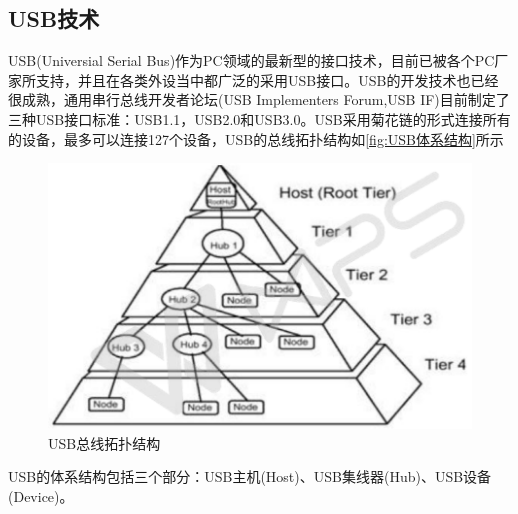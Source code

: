 \subsection{USB技术}
	USB(Universial Serial Bus)作为PC领域的最新型的接口技术，目前已被各个PC厂家所支持，并且在各类外设当中都广泛的采用USB接口。USB的开发技术也已经很成熟，通用串行总线开发者论坛(USB Implementers Forum,USB IF)目前制定了三种USB接口标准：USB1.1，USB2.0和USB3.0。USB采用菊花链的形式连接所有的设备，最多可以连接127个设备，USB的总线拓扑结构如\autoref{fig:USB体系结构}所示
\begin{figure}[!h]
\centering
\includegraphics[width=1.0\textwidth]{./graphics/usb-structure.pdf}
\caption{USB总线拓扑结构}\label{fig:USB体系结构}
\end{figure}


USB的体系结构包括三个部分：USB主机(Host)、USB集线器(Hub)、USB设备(Device)。
	
